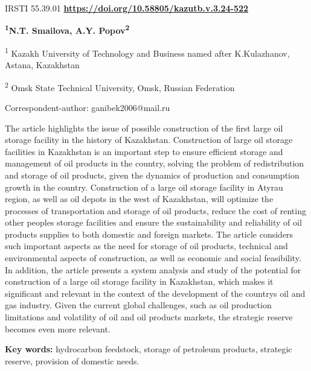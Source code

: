 \newpage
IRSTI 55.39.01
\hfill {\bfseries \href{https://doi.org/10.58805/kazutb.v.3.24-522}{https://doi.org/10.58805/kazutb.v.3.24-522}}


\begin{center}
{\bfseries \textsuperscript{1}N.T. Smailova\envelope, A.Y.
Popov\textsuperscript{2}}

\textsuperscript{1} Kazakh University of Technology and Business named
after K.Kulazhanov, Astana, Kazakhstan

\textsuperscript{2} Omsk State Technical University, Omsk, Russian
Federation
\end{center}
\envelope Correspondent-author: ganibek2006@mail.ru


The article highlights the issue of possible construction of the first
large oil storage facility in the history of Kazakhstan. Construction of
large oil storage facilities in Kazakhstan is an important step to
ensure efficient storage and management of oil products in the country,
solving the problem of redistribution and storage of oil products, given
the dynamics of production and consumption growth in the country.
Construction of a large oil storage facility in Atyrau region, as well
as oil depots in the west of Kazakhstan, will optimize the processes of
transportation and storage of oil products, reduce the cost of renting
other people\textquotesingle s storage facilities and ensure the
sustainability and reliability of oil products supplies to both domestic
and foreign markets. The article considers such important aspects as the
need for storage of oil products, technical and environmental aspects of
construction, as well as economic and social feasibility. In addition,
the article presents a system analysis and study of the potential for
construction of a large oil storage facility in Kazakhstan, which makes
it significant and relevant in the context of the development of the
country\textquotesingle s oil and gas industry. Given the current global
challenges, such as oil production limitations and volatility of oil and
oil products markets, the strategic reserve becomes even more relevant.

{\bfseries Key words:} hydrocarbon feedstock, storage of petroleum
products, strategic reserve, provision of domestic needs.


